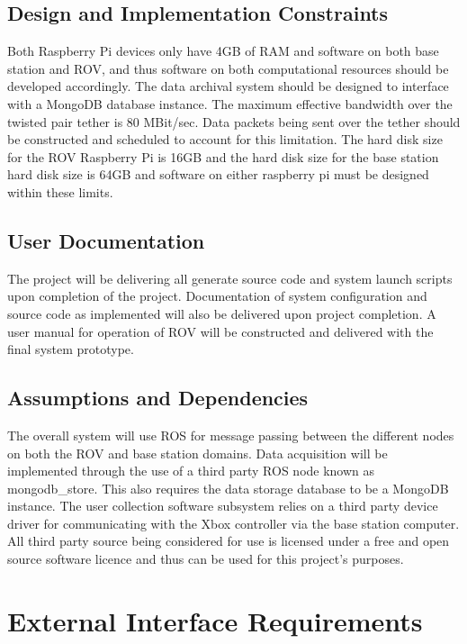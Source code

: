 \documentclass{scrreprt}
\begin{document}
\section{Design and Implementation Constraints}
Both Raspberry Pi devices only have 4GB of RAM and software on both base station and ROV, and thus software on both computational resources should be developed accordingly. The data archival system should be designed to interface with a MongoDB database instance. The maximum effective bandwidth over the twisted pair tether is 80 MBit/sec. Data packets being sent over the tether should be constructed and scheduled to account for this limitation. The hard disk size for the ROV Raspberry Pi is 16GB and the hard disk size for the base station hard disk size is 64GB and software on either raspberry pi must be designed within these limits.  

\section{User Documentation}
The project will be delivering all generate source code and system launch scripts upon completion of the project. Documentation of system configuration and source code as implemented will also be delivered upon project completion. A user manual for operation of ROV will be constructed and delivered with the final system prototype. 

\section{Assumptions and Dependencies}

The overall system will use ROS for message passing between the different nodes on both the ROV and base station domains. Data acquisition will be implemented through the use of a third party ROS node known as mongodb_store. This also requires the data storage database to be a MongoDB instance. The user collection software subsystem relies on a third party device driver for communicating with the Xbox controller via the base station computer. All third party source being considered for use is licensed under a free and open source software licence and thus can be used for this project's purposes. 

\chapter{External Interface Requirements}
\end{document}
